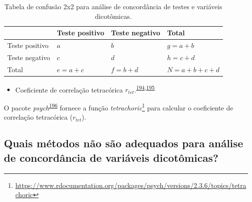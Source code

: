 \documentclass[
  a4paper,
]{book}
\providecommand{\tightlist}{%
  \setlength{\itemsep}{0pt}\setlength{\parskip}{0pt}}
\renewcommand{\href}[2]{#2\footnote{\url{#1}}}
\newenvironment{infobox}[1]
  {
  \begin{itemize}
  \renewcommand{\labelitemi}{
    \raisebox{-.7\height}[0pt][0pt]{
      {\setkeys{Gin}{width=3em,keepaspectratio}
        \texttt{[image: \#1]}}
    }
  }
  \setlength{\fboxsep}{1em}
  \begin{blackbox}
  \item
  }
  {
  \end{blackbox}
  \end{itemize}
  }
\begin{document}
\begin{table}

\caption{\label{tab:crosstable-kappa-2x2}Tabela de confusão 2x2 para análise de concordância de testes e variáveis dicotômicas.}
\centering
\begin{tabu} to 
\toprule
\textbf{ } & \textbf{Teste positivo} & \textbf{Teste negativo} & \textbf{Total}\\
\midrule
Teste positivo & $a$ & $b$ & $g=a+b$\\
Teste negativo & $c$ & $d$ & $h=c+d$\\
Total & $e=a+c$ & $f=b+d$ & $N=a+b+c+d$\\
\bottomrule
\end{tabu}
\end{table}

\begin{itemize}
\tightlist
\item
  Coeficiente de correlação tetracórica \(r_{tet}\).\textsuperscript{\protect\hyperlink{ref-i.mathe1901}{194},\protect\hyperlink{ref-banerjee1999}{195}}
\end{itemize}

\begin{infobox}{images/Rlogo}
O pacote \emph{psych}\textsuperscript{\protect\hyperlink{ref-psych}{196}} fornece a função \href{https://www.rdocumentation.org/packages/psych/versions/2.3.6/topics/tetrachoric}{\emph{tetrachoric}} para calcular o coeficiente de correlação tetracórica (\(r_{tet}\)).

\end{infobox}

\hypertarget{quais-muxe9todos-nuxe3o-suxe3o-adequados-para-anuxe1lise-de-concorduxe2ncia-de-variuxe1veis-dicotuxf4micas}{%
\subsection{Quais métodos não são adequados para análise de concordância de variáveis dicotômicas?}\label{quais-muxe9todos-nuxe3o-suxe3o-adequados-para-anuxe1lise-de-concorduxe2ncia-de-variuxe1veis-dicotuxf4micas}}
\end{document}
